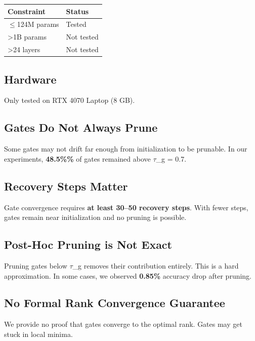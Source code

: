 \begin{table}[H]
\centering
\small
\begin{tabular}{ll}
\toprule
\textbf{Constraint} & \textbf{Status} \\
\midrule
$\le$124M params & Tested \\
>1B params & Not tested \\
>24 layers & Not tested \\
\bottomrule
\end{tabular}
\end{table}

\subsection{Hardware}

Only tested on RTX 4070 Laptop (8 GB).

\subsection{Gates Do Not Always Prune}

Some gates may not drift far enough from initialization to be prunable. In 
our experiments, \textbf{48.5\%\%} of gates remained above $\tau$\_g = 0.7.

\subsection{Recovery Steps Matter}

Gate convergence requires \textbf{at least 30--50 recovery steps}. With fewer 
steps, gates remain near initialization and no pruning is possible.

\subsection{Post-Hoc Pruning is Not Exact}

Pruning gates below $\tau$\_g removes their contribution entirely. This is a 
hard approximation. In some cases, we observed \textbf{0.85\%} accuracy 
drop after pruning.

\subsection{No Formal Rank Convergence Guarantee}

We provide no proof that gates converge to the optimal rank. Gates may 
get stuck in local minima.

